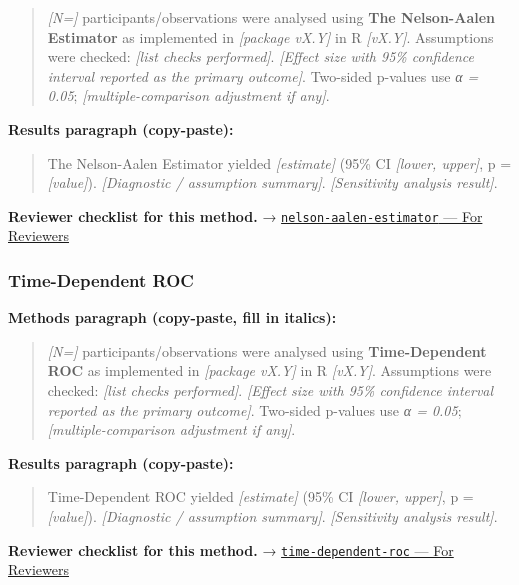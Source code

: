 \documentclass[
]{article}
\begin{document}
\begin{quote}
\emph{{[}N={]}} participants/observations were analysed using
\textbf{The Nelson-Aalen Estimator} as implemented in \emph{{[}package
vX.Y{]}} in R \emph{{[}vX.Y{]}}. Assumptions were checked: \emph{{[}list
checks performed{]}}. \emph{{[}Effect size with 95\% confidence interval
reported as the primary outcome{]}}. Two-sided p-values use \emph{α =
0.05}; \emph{{[}multiple-comparison adjustment if any{]}}.
\end{quote}

\textbf{Results paragraph (copy-paste):}

\begin{quote}
The Nelson-Aalen Estimator yielded \emph{{[}estimate{]}} (95\% CI
\emph{{[}lower, upper{]}}, p = \emph{{[}value{]}}). \emph{{[}Diagnostic
/ assumption summary{]}}. \emph{{[}Sensitivity analysis result{]}}.
\end{quote}

\textbf{Reviewer checklist for this method.} →
\href{../chapters/11-survival/nelson-aalen-estimator.Rmd\#for-reviewers}{\texttt{nelson-aalen-estimator}
--- For Reviewers}

\subsubsection{Time-Dependent ROC}\label{time-dependent-roc}

\textbf{Methods paragraph (copy-paste, fill in italics):}

\begin{quote}
\emph{{[}N={]}} participants/observations were analysed using
\textbf{Time-Dependent ROC} as implemented in \emph{{[}package vX.Y{]}}
in R \emph{{[}vX.Y{]}}. Assumptions were checked: \emph{{[}list checks
performed{]}}. \emph{{[}Effect size with 95\% confidence interval
reported as the primary outcome{]}}. Two-sided p-values use \emph{α =
0.05}; \emph{{[}multiple-comparison adjustment if any{]}}.
\end{quote}

\textbf{Results paragraph (copy-paste):}

\begin{quote}
Time-Dependent ROC yielded \emph{{[}estimate{]}} (95\% CI
\emph{{[}lower, upper{]}}, p = \emph{{[}value{]}}). \emph{{[}Diagnostic
/ assumption summary{]}}. \emph{{[}Sensitivity analysis result{]}}.
\end{quote}

\textbf{Reviewer checklist for this method.} →
\href{../chapters/11-survival/time-dependent-roc.Rmd\#for-reviewers}{\texttt{time-dependent-roc}
--- For Reviewers}
\end{document}
